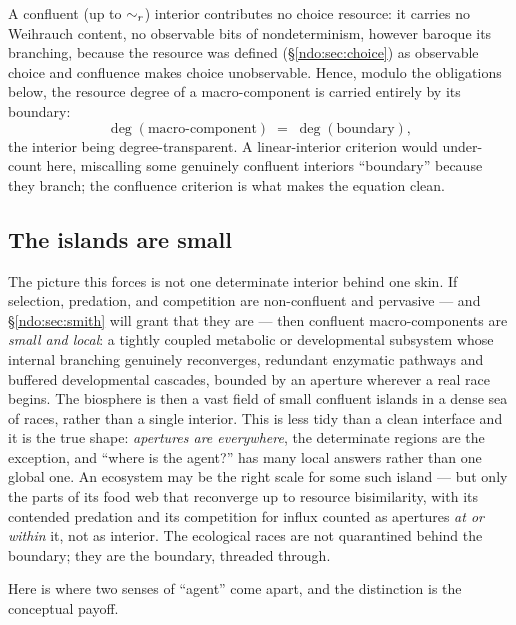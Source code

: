 \begin{proposition}\label{ndo:prop:degree}
A confluent (up to $\sim_{r}$) interior contributes no choice resource: it carries
no Weihrauch content, no observable bits of nondeterminism, however baroque its
branching, because the resource was defined (\S\ref{ndo:sec:choice}) as observable
choice and confluence makes choice unobservable. Hence, modulo the obligations
below, the resource degree of a macro-component is carried entirely by its
boundary:
\[
\deg(\text{macro-component}) \;=\; \deg(\text{boundary}),
\]
the interior being degree-transparent. A linear-interior criterion would
under-count here, miscalling some genuinely confluent interiors ``boundary''
because they branch; the confluence criterion is what makes the equation clean.
\end{proposition}


\subsection{The islands are small}

The picture this forces is not one determinate interior behind one skin. If
selection, predation, and competition are non-confluent and pervasive --- and
\S\ref{ndo:sec:smith} will grant that they are --- then confluent macro-components are
\emph{small and local}: a tightly coupled metabolic or developmental subsystem whose
internal branching genuinely reconverges, redundant enzymatic pathways and buffered
developmental cascades, bounded by an aperture wherever a real race begins. The
biosphere is then a vast field of small confluent islands in a dense sea of races,
rather than a single interior. This is less tidy than a clean interface and it is the
true shape: \emph{apertures are everywhere}, the determinate regions are the exception,
and ``where is the agent?'' has many local answers rather than one global one. An
ecosystem may be the right scale for some such island --- but only the parts of its food
web that reconverge up to resource bisimilarity, with its contended predation and its
competition for influx counted as apertures \emph{at or within} it, not as interior. The
ecological races are not quarantined behind the boundary; they are the boundary,
threaded through.

Here is where two senses of ``agent'' come apart, and the distinction is the conceptual
payoff.

